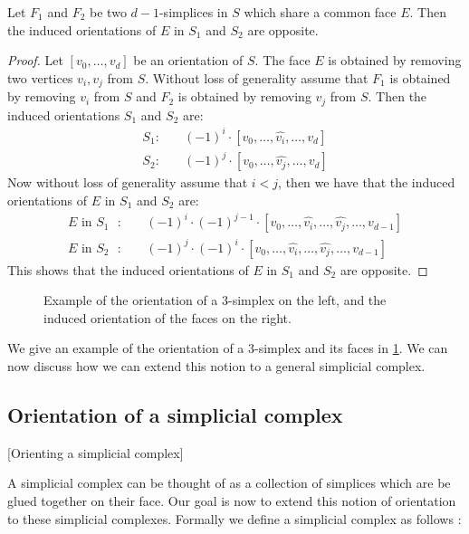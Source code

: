 \begin{claim}
    \label{claim:opposite_orientations}
    Let $F_1$ and $F_2$ be two $d-1$-simplices in $S$ which share a common face $E$. Then the induced orientations of $E$ in $S_1$ and $S_2$ are opposite.
\end{claim}
\begin{proof}
    Let $[v_0, \dots, v_{d}]$ be an orientation of $S$. The face $E$ is obtained by removing two vertices $v_i, v_j$ from $S$. Without loss of generality assume that $F_1$ is obtained by removing $v_i$ from $S$ and $F_2$ is obtained by removing $v_j$ from $S$. Then the induced orientations $S_1$ and $S_2$ are:
    \begin{align*}
        S_1: \quad & (-1)^i \cdot [v_0, \dots, \hat{v_i}, \dots, v_{d}] \\
        S_2: \quad & (-1)^j \cdot [v_0, \dots, \hat{v_j}, \dots, v_{d}]
    \end{align*}
    Now without loss of generality assume that $i < j$, then we have that the induced orientations of $E$ in $S_1$ and $S_2$ are:
    \begin{align*}
        \text{$E$ in $S_1$ }: \quad & (-1)^i \cdot (-1)^{j-1} \cdot [v_0, \dots, \hat{v_i}, \dots, \hat{v_j}, \dots, v_{d-1}] \\
        \text{$E$ in $S_2$ }: \quad & (-1)^j \cdot (-1)^i \cdot [v_0, \dots, \hat{v_i}, \dots, \hat{v_j}, \dots, v_{d-1}]
    \end{align*}
    This shows that the induced orientations of $E$ in $S_1$ and $S_2$ are opposite.
\end{proof}

\begin{figure}[ht]
    \centering
    \caption[Orientation of a simplex]{Example of the orientation of a 3-simplex on the left, and the induced orientation of the faces on the right.}
    \label{fig:orientation_of_simplex}
\end{figure}

We give an example of the orientation of a 3-simplex and its faces in \cref{fig:orientation_of_simplex}. We can now discuss how we can extend this notion to a general simplicial complex.

\subsection{Orientation of a simplicial complex}[Orienting a simplicial complex]

A simplicial complex can be thought of as a collection of simplices which are be glued together on their face. Our goal is now to extend this notion of orientation to these simplicial complexes. Formally we define a simplicial complex as follows :


